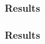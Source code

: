 \documentclass[notes=show]{beamer}
\begin{document}
\begin{frame}
\frametitle{Results}
\end{frame}
\begin{comment}
Benchmarks vs pheet
State compiler flags, system, compiler
Reasons:
* Counting networks unsuited for this task (we don't return count after inc, thus
losing all advantages)
* Many! more instructions instead of a single fetch_and_increment
* No thread locality
* Valgrind shows nothing interesting
\end{comment}

\begin{frame}
\frametitle{Results}
\end{frame}
\end{document}
